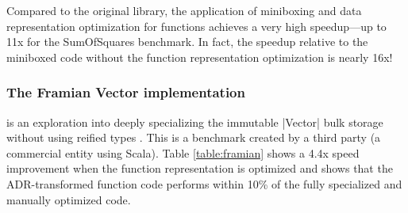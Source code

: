 Compared to the original library, the application of miniboxing and
data representation optimization for functions achieves a very high
speedup---up to 11x for the SumOfSquares benchmark. In fact, the
speedup relative to the miniboxed code without the function
representation optimization is nearly 16x! 


\subsubsection*{The Framian Vector implementation} is an exploration into deeply specializing the immutable |Vector| bulk storage without using reified types \cite{tixxit-respecialization15,tixxit-respecialization6}. This is a benchmark created by a third party (a commercial entity using Scala). Table \ref{table:framian} shows a 4.4x speed improvement when the function representation is optimized and shows that the ADR-transformed function code performs within 10\% of the fully specialized and manually optimized code. 

